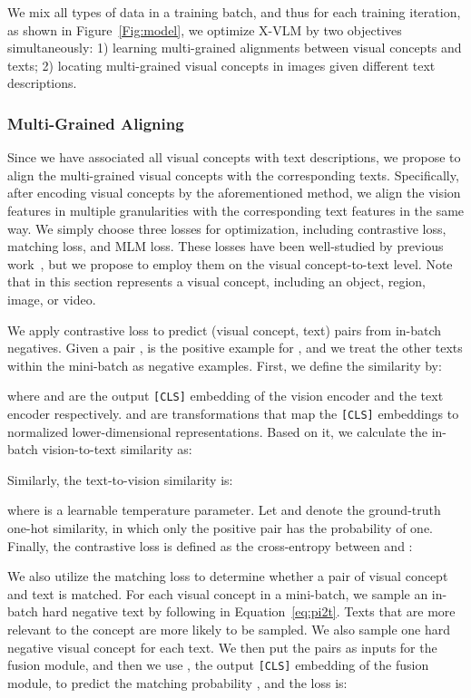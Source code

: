 \documentclass{article}
\newcommand{\baby}{X-VLM\xspace}
\begin{document}
We mix all types of data in a training batch, and thus for each training iteration, as shown in Figure~\ref{Fig:model}, we optimize \baby by two objectives simultaneously: 1) learning multi-grained alignments between visual concepts and texts; 2) locating multi-grained visual concepts in images given different text descriptions. 


\subsubsection{Multi-Grained Aligning}
Since we have associated all visual concepts with text descriptions, we propose to align the multi-grained visual concepts with the corresponding texts. Specifically, after encoding visual concepts by the aforementioned method, we align the vision features in multiple granularities with the corresponding text features in the same way. We simply choose three losses for optimization, including contrastive loss, matching loss, and MLM loss. These losses have been well-studied by previous work~\cite{chen2020uniter, radford2021learning, li2021align}, but we propose to employ them on the visual concept-to-text level. Note that  in this section represents a visual concept, including an object, region, image, or video. 


We apply contrastive loss to predict (visual concept, text) pairs from in-batch negatives. Given a pair ,  is the positive example for , and we treat the other  texts within the mini-batch as negative examples. First, we define the similarity by: 

where  and  are the output \texttt{[CLS]} embedding of the vision encoder and the text encoder respectively.  and  are transformations that map the \texttt{[CLS]} embeddings to normalized lower-dimensional representations. Based on it, we calculate the in-batch vision-to-text similarity as: 

Similarly, the text-to-vision similarity is: 

where  is a learnable temperature parameter. Let  and  denote the ground-truth one-hot similarity, in which only the positive pair has the probability of one. Finally, the contrastive loss is defined as the cross-entropy  between  and : 





We also utilize the matching loss to determine whether a pair of visual concept and text is matched. For each visual concept in a mini-batch, we sample an in-batch hard negative text by following  in Equation~\ref{eq:pi2t}. Texts that are more relevant to the concept are more likely to be sampled. We also sample one hard negative visual concept for each text. We then put the pairs as inputs for the fusion module, and then we use , the output \texttt{[CLS]} embedding of the fusion module, to predict the matching probability , and the loss is:
\end{document}
